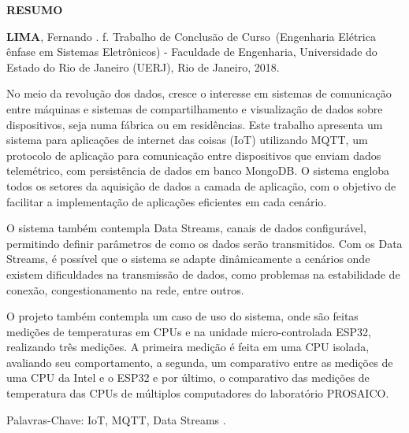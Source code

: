 \begin{center}
\textbf{RESUMO}
\end{center}

%
%


$\!$\\

\hspace{-1.3cm}\textbf{LIMA}, Fernando \textit{\setTitulo}. \pageref{LastPage} f. Trabalho de Conclusão de Curso~(Engenharia Elétrica ênfase em Sistemas Eletrônicos) - Faculdade de Engenharia, Universidade do Estado do Rio de Janeiro (UERJ), Rio de Janeiro, 2018.

\vspace{.2cm}

No meio da revolução dos dados, cresce o interesse em sistemas de comunicação entre máquinas e sistemas de compartilhamento e visualização de dados  sobre dispositivos, seja numa fábrica ou em residências. Este trabalho apresenta um sistema para aplicações de internet das coisas (IoT) utilizando MQTT, um protocolo de aplicação para comunicação entre dispositivos que enviam dados telemétrico, com persistência de dados em banco MongoDB. O sistema engloba todos os setores da aquisição de dados a camada de aplicação, com o objetivo de facilitar a implementação de aplicações eficientes em cada cenário.

O sistema também contempla  Data Streams, canais de dados configurável, permitindo definir parâmetros de como os dados serão transmitidos. Com os Data Streams, é possível que o sistema se adapte dinâmicamente a cenários onde existem dificuldades na transmissão de dados, como problemas na estabilidade de conexão, congestionamento na rede, entre outros.

O projeto também contempla um caso de uso do sistema, onde são feitas medições de temperaturas em CPUs e na unidade micro-controlada ESP32, realizando três medições. A primeira medição é feita em uma CPU isolada, avaliando seu comportamento, a segunda, um comparativo entre as medições de uma CPU da Intel e o ESP32 e por último, o comparativo das medições de temperatura das CPUs de múltiplos computadores do laboratório PROSAICO. 



\vspace{1cm}

\hspace{-1.3cm}Palavras-Chave: IoT, MQTT, Data Streams .